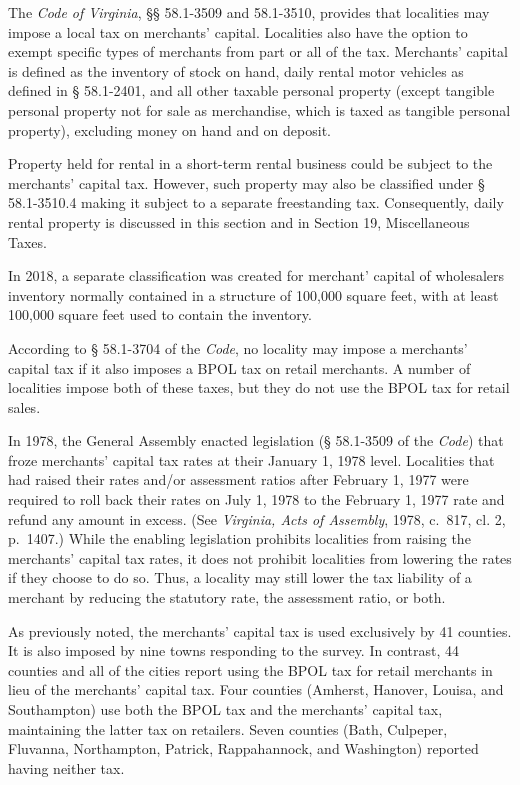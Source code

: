 \documentclass[
]{book}
\begin{document}
The \emph{Code of Virginia}, §§ 58.1-3509 and 58.1-3510, provides that localities may impose a local tax on merchants' capital. Localities also have the option to exempt specific types of merchants from part or all of the tax. Merchants' capital is defined as the inventory of stock on hand, daily rental motor vehicles as defined in § 58.1-2401, and all other taxable personal property (except tangible personal property not for sale as merchandise, which is taxed as tangible personal property), excluding money on hand and on deposit.

Property held for rental in a short-term rental business could be subject to the merchants' capital tax. However, such property may also be classified under § 58.1-3510.4 making it subject to a separate freestanding tax. Consequently, daily rental property is discussed in this section and in Section 19, Miscellaneous Taxes.

In 2018, a separate classification was created for merchant' capital of wholesalers inventory normally contained in a structure of 100,000 square feet, with at least 100,000 square feet used to contain the inventory.

According to § 58.1-3704 of the \emph{Code}, no locality may impose a merchants' capital tax if it also imposes a BPOL tax on retail merchants. A number of localities impose both of these taxes, but they do not use the BPOL tax for retail sales.

In 1978, the General Assembly enacted legislation (§ 58.1-3509 of the \emph{Code}) that froze merchants' capital tax rates at their January 1, 1978 level. Localities that had raised their rates and/or assessment ratios after February 1, 1977 were required to roll back their rates on July 1, 1978 to the February 1, 1977 rate and refund any amount in excess. (See \emph{Virginia, Acts of Assembly}, 1978, c.~817, cl. 2, p.~1407.) While the enabling legislation prohibits localities from raising the merchants' capital tax rates, it does not prohibit localities from lowering the rates if they choose to do so. Thus, a locality may still lower the tax liability of a merchant by reducing the statutory rate, the assessment ratio, or both.

As previously noted, the merchants' capital tax is used exclusively by 41 counties. It is also imposed by nine towns responding to the survey. In contrast, 44 counties and all of the cities report using the BPOL tax for retail merchants in lieu of the merchants' capital tax. Four counties (Amherst, Hanover, Louisa, and Southampton) use both the BPOL tax and the merchants' capital tax, maintaining the latter tax on retailers. Seven counties (Bath, Culpeper, Fluvanna, Northampton, Patrick, Rappahannock, and Washington) reported having neither tax.
\end{document}
